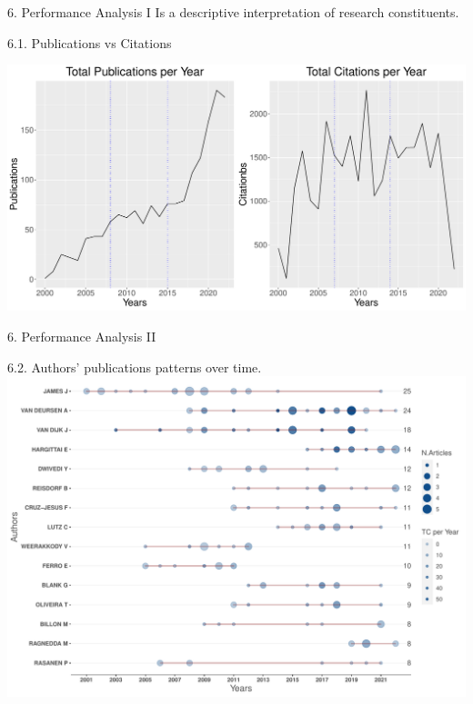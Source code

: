 \documentclass[
  ignorenonframetext,
]{beamer}
\begin{document}
\begin{frame}{6. Performance Analysis I}
\protect\hypertarget{performance-analysis-i}{}
Is a descriptive interpretation of research constituents.

\begin{block}{6.1. Publications vs Citations}
\protect\hypertarget{publications-vs-citations}{}
\vspace{0.5cm}

\includegraphics{Presentation_bibliometric_files/figure-beamer/Panel cite vs prod-1.pdf}
\end{block}
\end{frame}

\begin{frame}{6. Performance Analysis II}
\protect\hypertarget{performance-analysis-ii}{}
\vspace{0.5cm}

\begin{block}{6.2. Authors' publications patterns over time.}
\protect\hypertarget{authors-publications-patterns-over-time.}{}
\includegraphics{Presentation_bibliometric_files/figure-beamer/Prod of AU-1.pdf}
\end{block}
\end{frame}
\end{document}
